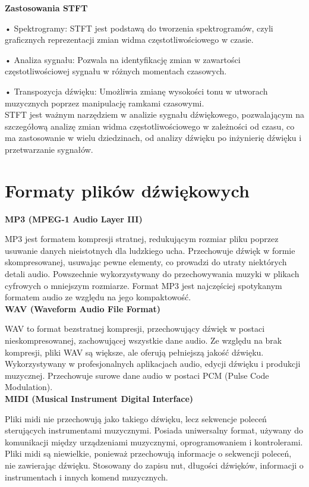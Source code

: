 \textbf{Zastosowania STFT}

• Spektrogramy: STFT jest podstawą do tworzenia spektrogramów, czyli graficznych reprezentacji zmian widma częstotliwościowego w czasie.

• Analiza sygnału: Pozwala na identyfikację zmian w zawartości częstotliwościowej sygnału w różnych momentach czasowych.

• Transpozycja dźwięku: Umożliwia zmianę wysokości tonu w utworach muzycznych poprzez manipulację ramkami czasowymi.\\

STFT jest ważnym narzędziem w analizie sygnału dźwiękowego, pozwalającym na szczegółową analizę zmian widma częstotliwościowego w zależności od czasu, co ma zastosowanie w wielu dziedzinach, od analizy dźwięku po inżynierię dźwięku i przetwarzanie sygnałów.

\section{Formaty plików dźwiękowych}

\noindent\textbf{MP3 (MPEG-1 Audio Layer III)}

MP3 jest formatem kompresji stratnej, redukującym rozmiar pliku poprzez usuwanie danych nieistotnych dla ludzkiego ucha. Przechowuje dźwięk w formie skompresowanej, usuwając pewne elementy, co prowadzi do utraty niektórych detali audio. Powszechnie wykorzystywany do przechowywania muzyki w plikach cyfrowych o mniejszym rozmiarze. Format MP3 jest najczęściej spotykanym formatem audio ze względu na jego kompaktowość.\\

\noindent\textbf{WAV (Waveform Audio File Format)}

WAV to format bezstratnej kompresji, przechowujący dźwięk w postaci nieskompresowanej, zachowującej wszystkie dane audio. Ze względu na brak kompresji, pliki WAV są większe, ale oferują pełniejszą jakość dźwięku. Wykorzystywany w profesjonalnych aplikacjach audio, edycji dźwięku i produkcji muzycznej. Przechowuje surowe dane audio w postaci PCM (Pulse Code Modulation).\\

\noindent\textbf{MIDI (Musical Instrument Digital Interface)}

Pliki midi nie przechowują jako takiego dźwięku, lecz sekwencje poleceń sterujących instrumentami muzycznymi. Posiada uniwersalny format, używany do komunikacji między urządzeniami muzycznymi, oprogramowaniem i kontrolerami. Pliki midi są niewielkie, ponieważ przechowują informacje o sekwencji poleceń, nie zawierając dźwięku. Stosowany do zapisu nut, długości dźwięków, informacji o instrumentach i innych komend muzycznych.

